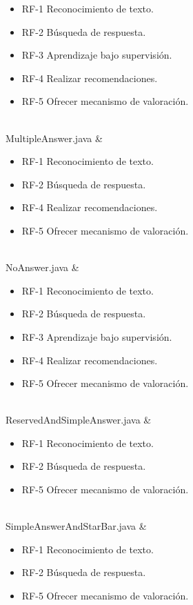 {\begin{itemize}
 \item RF-1 Reconocimiento de texto.
 \item RF-2 Búsqueda de respuesta.
 \item RF-3 Aprendizaje bajo supervisión.
 \item RF-4 Realizar recomendaciones.
 \item RF-5 Ofrecer mecanismo de valoración.
 \end{itemize}  				
 \\
 MultipleAnswer.java 		&
 \begin{itemize}
 \item RF-1 Reconocimiento de texto.
 \item RF-2 Búsqueda de respuesta.
 \item RF-4 Realizar recomendaciones.
 \item RF-5 Ofrecer mecanismo de valoración.
 \end{itemize}  				
 \\
 NoAnswer.java 		&
 \begin{itemize}
 	\item RF-1 Reconocimiento de texto.
 	\item RF-2 Búsqueda de respuesta.
 	\item RF-3 Aprendizaje bajo supervisión.
 	\item RF-4 Realizar recomendaciones.
 	\item RF-5 Ofrecer mecanismo de valoración.
 \end{itemize}  				
 \\
 ReservedAndSimpleAnswer.java 		&
 \begin{itemize}
 \item RF-1 Reconocimiento de texto.
 \item RF-2 Búsqueda de respuesta.
 \item RF-5 Ofrecer mecanismo de valoración.
 \end{itemize}  				
 \\
 SimpleAnswerAndStarBar.java 		&
 \begin{itemize}
 \item RF-1 Reconocimiento de texto.
 \item RF-2 Búsqueda de respuesta.
 \item RF-5 Ofrecer mecanismo de valoración.
 \end{itemize}  				
 \\}